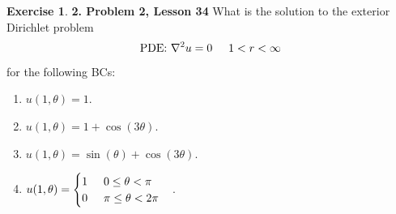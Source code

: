\documentclass{book}
\theoremstyle{definition}
\newtheorem*{exer*}{Exercise}
\begin{document}
\begin{exer*}\textbf{2. Problem 2, Lesson 34} 
	What is the solution to the exterior Dirichlet problem
	\begin{align*}
	\text{PDE: } \laplacian u = 0 \hspace{0.5cm} 1 < r < \infty
	\end{align*}
	for the following BCs:
	\begin{enumerate}
		\item $u(1,\theta) = 1$.
		\item $u(1,\theta) = 1 + \cos(3\theta)$.
		\item $u(1,\theta) = \sin(\theta) + \cos(3\theta)$.
		\item $u(1,\theta) = \begin{cases}
		1 \hspace{0.5cm} 0 \leq \theta < \pi\\
		0 \hspace{0.5cm} \pi \leq \theta < 2\pi
		\end{cases}$.
	\end{enumerate}



\end{exer*}
\end{document}
